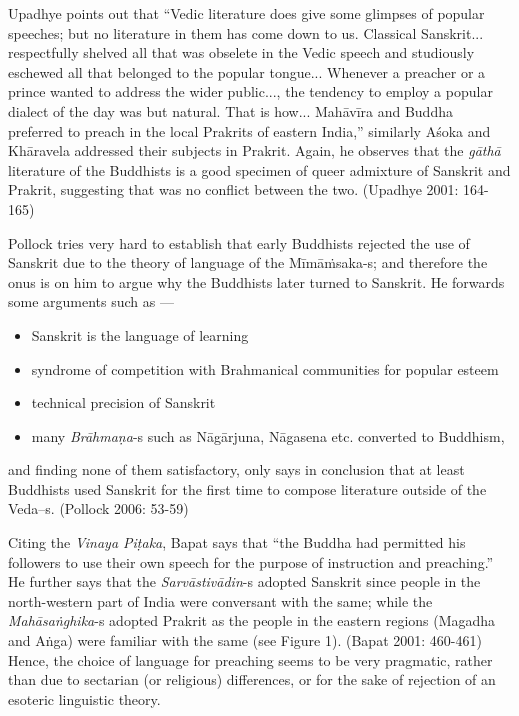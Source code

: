 Upadhye points out that “Vedic literature does give some glimpses of popular speeches; but no literature in them has come down to us. Classical Sanskrit... respectfully shelved all that was obselete in the Vedic speech and studiously eschewed all that belonged to the popular tongue... Whenever a preacher or a prince wanted to address the wider public..., the tendency to employ a popular dialect of the day was but natural. That is how... Mahāvīra and Buddha preferred to preach in the local Prakrits of eastern India,” similarly Aśoka and Khāravela addressed their subjects in Prakrit. Again, he observes that the \textit{gāthā} literature of the Buddhists is a good specimen of queer admixture of Sanskrit and Prakrit, suggesting that was no conflict between the two. (Upadhye 2001: 164-165)

Pollock tries very hard to establish that early Buddhists rejected the use of Sanskrit due to the theory of language of the Mīmāṁsaka-s; and therefore the onus is on him to argue why the Buddhists later turned to Sanskrit. He forwards some arguments such as —

\begin{itemize}
\itemsep=0pt
\item Sanskrit is the language of learning

 \item syndrome of competition with Brahmanical communities for popular esteem

 \item technical precision of Sanskrit

 \item many \textit{Brāhmaṇa}-s such as Nāgārjuna, Nāgasena etc. converted to Buddhism,

\end{itemize}

and finding none of them satisfactory, only says in conclusion that at least Buddhists used Sanskrit for the first time to compose literature outside of the Veda--s. (Pollock 2006: 53-59)

Citing the \textit{Vinaya Piṭaka}, Bapat says that “the Buddha had permitted his followers to use their own speech for the purpose of instruction and preaching.” He further says that the \textit{Sarvāstivādin}-s adopted Sanskrit since people in the north-western part of India were conversant with the same; while the \textit{Mahāsaṅghika}-s adopted Prakrit as the people in the eastern regions (Magadha and Aṅga) were familiar with the same (see Figure 1). (Bapat 2001: 460-461) Hence, the choice of language for preaching seems to be very pragmatic, rather than due to sectarian (or religious) differences, or for the sake of rejection of an esoteric linguistic theory.

